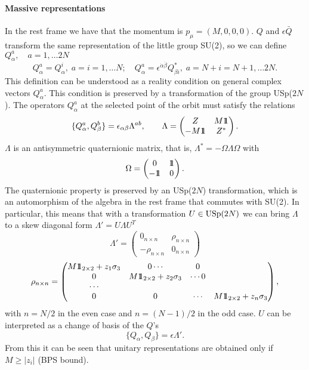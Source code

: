 \documentclass[a4paper,12pt]{article}
\begin{document}
\paragraph{Massive representations}  In the rest frame we have
that the  momentum is $p_\mu=(M,0,0,0)$.  $Q$ and $\epsilon\bar Q$
transform the same
 representation of the little group SU(2), so we can define
 $Q^a_\alpha, \quad a=1,\dots 2N$
$$Q^a_\alpha=Q_\alpha^i,\; a=i=1,\dots N;\quad
Q_\alpha^a=\epsilon^{\dot \alpha\dot\beta} Q^*_{\beta i},\;
a=N+i=N+1,\dots 2N.$$  This definition can be understood as a
reality condition on general complex vectors  $Q_\alpha^a$. This
condition is preserved by a transformation of the group USp($2N$).
The operators $Q_\alpha^a$ at the selected point of the orbit must
satisfy the relations
$$\{Q_\alpha^a,Q_\beta^b\}=\epsilon_{\alpha\beta}\Lambda^{ab},
\qquad
 \Lambda=\begin{pmatrix}Z&M\relax{\rm 1\kern-.35em 1}\\-M\relax{\rm 1\kern-.35em 1}&Z^*\end{pmatrix}.$$
$\Lambda$ is an antisymmetric  quaternionic matrix, that is,
$\Lambda^*=-\Omega\Lambda\Omega$ with $$\Omega=\begin{pmatrix}
0&\relax{\rm 1\kern-.35em 1}\\-\relax{\rm 1\kern-.35em 1}&0\end{pmatrix}.$$ The quaternionic property is
preserved by an USp($2N$) transformation, which is an automorphism
of the algebra in the rest frame that commutes with SU(2).  In
particular, this means
 that with a transformation $U\in \mathrm{USp}(2N)$ we can bring $\Lambda$ to a skew diagonal form
 $\Lambda'=U\Lambda U^T$ \cite{dfl}
$$\Lambda'=\begin{pmatrix}0_{n\times n}&\rho_{n\times n}\\
-\rho_{n\times n}&0_{n\times n}\end{pmatrix}$$\begin{equation}\rho_{n\times n}=
\begin{pmatrix}M\relax{\rm 1\kern-.35em 1}_{2\times 2}+z_1\sigma_3&0\cdots&0\\
0&M\relax{\rm 1\kern-.35em 1}_{2\times 2}+z_2\sigma_3&\cdots 0\\ \cdots\\
0&0&\cdots&M\relax{\rm 1\kern-.35em 1}_{2\times 2}+z_n\sigma_3
\end{pmatrix},\label{lambda}\end{equation}
with $n=N/2$ in the even case and $n=(N-1)/2$ in the odd case. $U$ can be interpreted as a change
 of basis of the $Q$'s
\begin{equation}\{Q_\alpha,Q_\beta\}=\epsilon\Lambda'.\label{anticomassive}
\end{equation}
From this it can be seen that unitary representations are obtained
only if $M\geq |z_i|$ (BPS bound).
\end{document}
